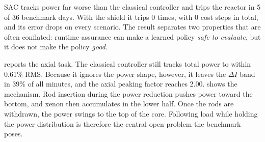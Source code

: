 \documentclass[11pt,a4paper]{article}
\begin{document}
SAC tracks power far worse than the classical controller and trips the reactor in
5 of 36 benchmark days. With the shield it trips
0 times, with 0 cost steps in total, and its error drops
on every scenario. The result separates two properties that are often conflated:
runtime assurance can make a learned policy \emph{safe to evaluate}, but it does not
make the policy \emph{good}.

 reports the axial task. The classical controller still tracks
total power to within 0.61\% RMS. Because it ignores the power shape, however,
it leaves the $\Delta I$ band in 39\% of all minutes, and the axial
peaking factor reaches 2.00.  shows the mechanism.
Rod insertion during the power reduction pushes power toward the bottom, and xenon then
accumulates in the lower half. Once the rods are withdrawn, the power swings to the top
of the core. Following load while holding the power distribution is therefore the
central open problem the benchmark poses.
\end{document}
